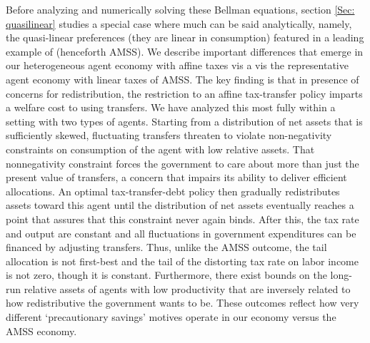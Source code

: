 \documentclass[thmsb,11pt]{article}
\begin{document}
Before analyzing and numerically solving  these Bellman equations, section \ref{Sec: quasilinear}
studies a special case where much can be said analytically, namely,
the  quasi-linear preferences  (they are linear in consumption) featured in a leading example of \citet{Aiyagari2002} (henceforth AMSS). We describe important differences that emerge in our heterogeneous agent economy with affine taxes vis a vis the representative agent economy with
linear taxes of AMSS.  The key finding is that in presence of concerns for redistribution, the restriction to an affine tax-transfer policy imparts a  welfare cost to using transfers. We have analyzed this most fully within a  setting with two types of agents. Starting from a distribution of net assets that is sufficiently skewed, fluctuating transfers threaten to violate non-negativity constraints on consumption of the agent with low relative assets. That nonnegativity constraint forces the government to care about more than just the present value of transfers, a concern that impairs its ability to deliver efficient allocations. An optimal tax-transfer-debt policy then gradually redistributes assets toward  this agent until the distribution of net assets eventually reaches  a point that assures that this constraint never  again binds. After this, the tax rate and output are constant and all fluctuations in government expenditures can be financed by adjusting transfers. Thus, unlike the AMSS outcome,
the tail allocation is not first-best and the tail of the distorting tax rate on labor income is not zero, though it is constant. Furthermore, there exist bounds on the long-run relative assets of agents with low productivity that are inversely related to how redistributive the government wants to be. These outcomes reflect how very different `precautionary savings' motives operate in our economy versus the AMSS economy.

\end{document}
